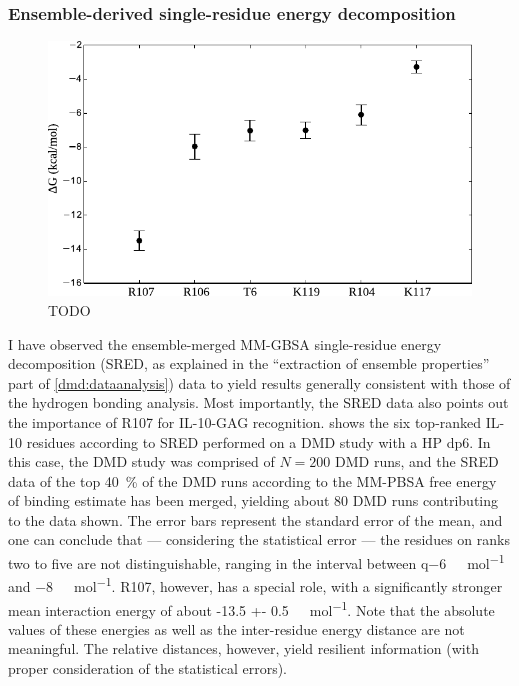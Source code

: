 \subsubsection{Ensemble-derived single-residue energy decomposition}

\begin{figure}
\centering
\includegraphics[width=1.0\textwidth]{gfx/dmdil10/round1_il10_SRED_hpdp6.pdf}
\caption[]{TODO}
\label{fig:dmdil10:SRED_hpdp6}
\end{figure}

I have observed the ensemble-merged MM-GBSA single-residue energy decomposition
(SRED, as explained in the \enquote{extraction of ensemble properties} part of
\cref{dmd:dataanalysis}) data to yield results generally consistent with those
of the hydrogen bonding analysis. Most importantly, the SRED data also points
out the importance of R107 for IL-10-GAG recognition.
 shows the six top-ranked IL-10 residues according
to SRED performed on a DMD study with a HP dp6. In this case, the DMD study was
comprised of $N=200$ DMD runs, and the SRED data of the top \SI{40}{\percent} of
the DMD runs according to the MM-PBSA free energy of binding estimate has been
merged, yielding about 80 DMD runs contributing to the data shown. The error
bars represent the standard error of the mean, and one can conclude that ---
considering the statistical error --- the residues on ranks two to five are not
distinguishable, ranging in the interval between q\SI{-6}{\kilo\calory\per\mol}
and \SI{-8}{\kilo\calory\per\mol}. R107, however, has a special role, with a
significantly stronger mean interaction energy of about \SI{-13.5 +-
0.5}{\kilo\calory\per\mol}. Note that the absolute values of these energies as
well as the inter-residue energy distance are not meaningful. The relative
distances, however, yield resilient information (with proper consideration of
the statistical errors).

